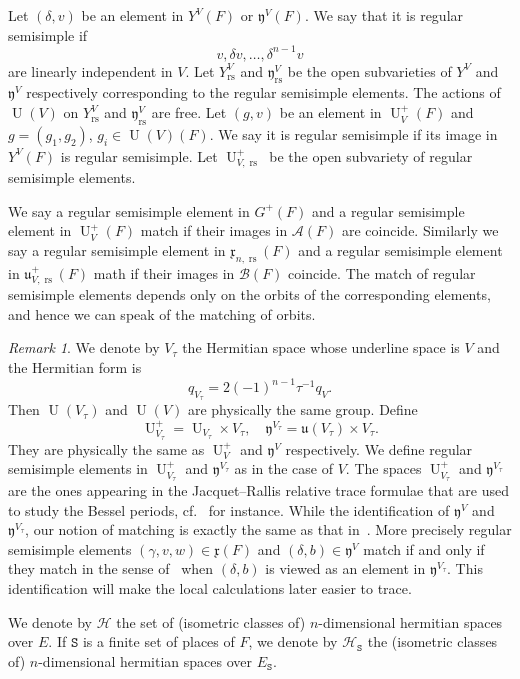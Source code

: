 \documentclass[letterpaper,11pt]{amsart}
\newcommand{\fu}{\mathfrak{u}}
\newcommand{\fx}{\mathfrak{x}}
\newcommand{\fy}{\mathfrak{y}}
\newcommand{\cA}{\mathcal{A}}
\newcommand{\cB}{\mathcal{B}}
\newcommand{\cH}{\mathcal{H}}
\newcommand{\tS}{\mathtt{S}}
\newcommand{\<}{\negthickspace}
\DeclareMathOperator{\U}{U}
\DeclareMathOperator{\rs}{rs}
\theoremstyle{definition}
\theoremstyle{plain}
\theoremstyle{remark}
\newtheorem{remark}[definition]{Remark}
\numberwithin{equation}{section}
\begin{document}
Let $(\delta, v)$ be an element in $Y^V(F)$ or $\fy^V(F)$. We say that it is
regular semisimple if
    \[
    v, \delta v, \hdots, \delta^{n-1} v
    \]
are linearly independent in $V$. Let $Y^V_{\rs}$ and $\fy^V_{\rs}$ be the
open subvarieties of $Y^V$ and $\fy^V$ respectively corresponding to the regular semisimple
elements. The actions of $\U(V)$ on $Y^V_{\rs}$ and $\fy^V_{\rs}$ are free.
Let $(g, v)$ be an element in $\U_V^+(F)$ and $g = (g_1, g_2)$, $g_i \in
\U(V)(F)$. We say it is regular semisimple if its image in $Y^V(F)$ is
regular semisimple. Let $\U^+_{V, \rs}$ be the open subvariety of regular
semisimple elements.

We say a regular semisimple element in $G^+(F)$ and a regular semisimple
element in $\U_V^+(F)$ match if their images in $\cA(F)$ are coincide.
Similarly we say a regular semisimple element in $\fx_{n, \rs}(F)$ and a
regular semisimple element in $\fu_{V, \rs}^+(F)$ math if their images in
$\cB(F)$ coincide. The match of regular semisimple elements depends only on
the orbits of the corresponding elements, and hence we can speak of the matching
of orbits.

\begin{remark}  \label{remark:Vtau}
We denote by $V_{\tau}$ the Hermitian space whose underline space is $V$ and
the Hermitian form is
    \[
    q_{V_{\tau}} = 2 (-1)^{n-1} \tau^{-1}  q_V.
    \]
Then $\U(V_\tau)$ and $\U(V)$ are physically the same group. Define
    \[
    \U_{V_\tau}^+ = \U_{V_{\tau}} \times V_{\tau},
    \quad \fy^{V_{\tau}} = \fu(V_{\tau}) \times V_{\tau}.
    \]
They are physically the same as $\U_{V}^+$ and $\fy^V$ respectively. We
define regular semisimple elements in $\U_{V_{\tau}}^+$ and $\fy^{V_{\tau}}$
as in the case of $V$. The spaces $\U_{V_{\tau}}^+$ and $\fy^{V_{\tau}}$ are
the ones appearing in the Jacquet--Rallis relative trace formulae that are
used to study the Bessel periods, cf.~\cites{CZ,Zhang1} for instance. While
the identification of $\fy^V$ and $\fy^{V_{\tau}}$, our notion of matching is
exactly the same as that in~\cites{BP1,CZ,Zhang1}. More precisely regular
semisimple elements $(\gamma, v, w) \in \fx(F)$ and $(\delta, b) \in \fy^V$
match if and only if they match in the sense of~\cites{BP1,CZ,Zhang1} when
$(\delta, b)$ is viewed as an element in $\fy^{V_{\tau}}$. This
identification will make the local calculations later easier to trace.
\end{remark}

We denote by $\cH$ the set of (isometric classes of) $n$-dimensional hermitian spaces over $E$. If $\tS$ is a finite set of places of $F$, we denote by $\cH_{\tS}$ the (isometric classes of) $n$-dimensional hermitian spaces over $E_{\tS}$.
\end{document}
